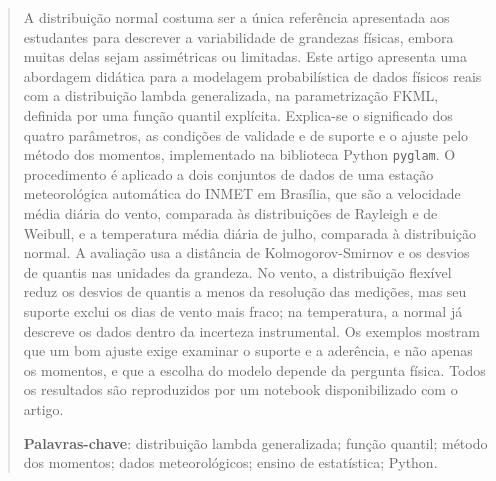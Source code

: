 
\begin{abstract}
A distribuição normal costuma ser a única referência apresentada aos estudantes para descrever a variabilidade de grandezas físicas, embora muitas delas sejam assimétricas ou limitadas. Este artigo apresenta uma abordagem didática para a modelagem probabilística de dados físicos reais com a distribuição lambda generalizada, na parametrização FKML, definida por uma função quantil explícita. Explica-se o significado dos quatro parâmetros, as condições de validade e de suporte e o ajuste pelo método dos momentos, implementado na biblioteca Python \texttt{pyglam}. O procedimento é aplicado a dois conjuntos de dados de uma estação meteorológica automática do INMET em Brasília, que são a velocidade média diária do vento, comparada às distribuições de Rayleigh e de Weibull, e a temperatura média diária de julho, comparada à distribuição normal. A avaliação usa a distância de Kolmogorov-Smirnov e os desvios de quantis nas unidades da grandeza. No vento, a distribuição flexível reduz os desvios de quantis a menos da resolução das medições, mas seu suporte exclui os dias de vento mais fraco; na temperatura, a normal já descreve os dados dentro da incerteza instrumental. Os exemplos mostram que um bom ajuste exige examinar o suporte e a aderência, e não apenas os momentos, e que a escolha do modelo depende da pergunta física. Todos os resultados são reproduzidos por um notebook disponibilizado com o artigo.

\medskip
\noindent\textbf{Palavras-chave}: distribuição lambda generalizada; função quantil; método dos momentos; dados meteorológicos; ensino de estatística; Python.
\end{abstract}

